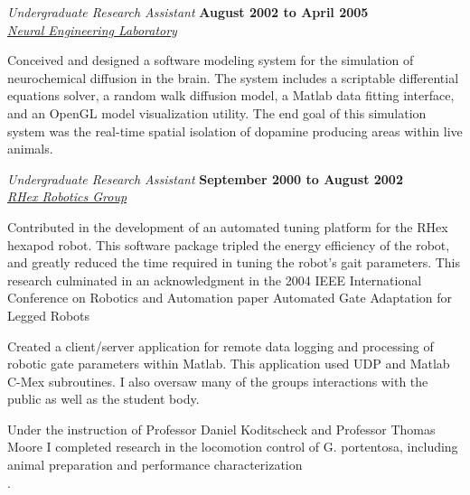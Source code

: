 \documentclass[10pt]{article}
\newenvironment{outerlist}[1][\enskip\textbullet]%
        {\begin{itemize}[#1]}{\end{itemize}%
         \vspace{-.6\baselineskip}}
\newenvironment{innerlist}[1][\enskip\textbullet]%
        {\begin{compactitem}[#1]}{\end{compactitem}}
\begin{document}
\begin{outerlist}
\item[] \textit{Undergraduate Research Assistant}%
        \hfill \textbf{August 2002 to April 2005} \\
        \href{http://nelab.engin.umich.edu/}{\textit{Neural Engineering Laboratory}}
\begin{innerlist}          
\item Conceived and designed a software modeling system for the simulation of neurochemical
diffusion in the brain. The system includes a scriptable differential equations solver, a random
walk diffusion model, a Matlab data fitting interface, and an OpenGL model visualization
utility. The end goal of this simulation system was the real-time spatial isolation of dopamine producing areas within live animals. \\

\end{innerlist}

\item[] \textit{Undergraduate Research Assistant}%
        \hfill \textbf{September 2000 to August 2002} \\
        \href{http://ai.eecs.umich.edu/RHex/ProjectOverview.html}{\textit{RHex Robotics Group}}
\begin{innerlist}         
\item Contributed in the development of an automated tuning platform for the RHex hexapod robot.
This software package tripled the energy efficiency of the robot, and greatly reduced the time
required in tuning the robot's gait parameters. This research culminated in an acknowledgment
in the 2004 IEEE International Conference on Robotics and Automation paper Automated
Gate Adaptation for Legged Robots\\
\item Created a client/server application for remote data logging and processing of robotic gate parameters within Matlab. This application used UDP and Matlab C-Mex subroutines. I also oversaw many of the groups interactions with the public as well as the student body.\\ 
\item Under the instruction of Professor Daniel Koditscheck and Professor Thomas Moore I completed research in the locomotion control of G. portentosa, including animal preparation and performance characterization\\. 
        
\end{innerlist}
\end{outerlist}
\end{document}

